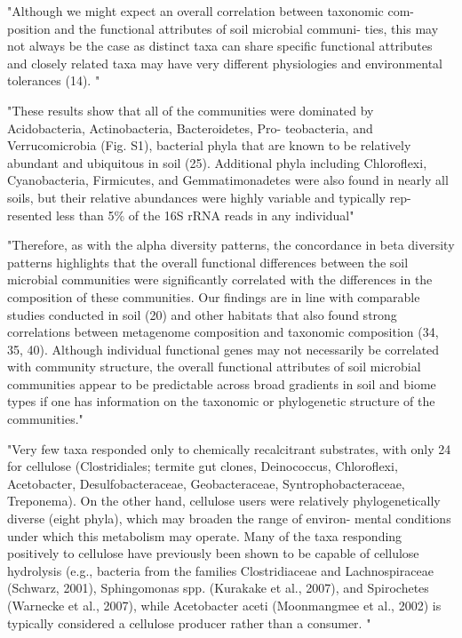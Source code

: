 "Although we might expect an overall correlation between taxonomic com- position and the functional attributes of soil microbial communi- ties, this may not always be the case as distinct taxa can share specific functional attributes and closely related taxa may have very different physiologies and environmental tolerances (14). "\cite{Fierer_2012}

"These results show that all of the communities were dominated by Acidobacteria, Actinobacteria, Bacteroidetes, Pro- teobacteria, and Verrucomicrobia (Fig. S1), bacterial phyla that are known to be relatively abundant and ubiquitous in soil (25). Additional phyla including Chloroflexi, Cyanobacteria, Firmicutes, and Gemmatimonadetes were also found in nearly all soils, but their relative abundances were highly variable and typically rep- resented less than 5\% of the 16S rRNA reads in any individual"\cite{Fierer_2012}

"Therefore, as with the alpha diversity patterns, the concordance in beta diversity patterns highlights that the overall functional differences between the soil microbial communities were significantly correlated with the differences in the composition of these communities. Our findings are in line with comparable studies conducted in soil (20) and other habitats that also found strong correlations between metagenome composition and taxonomic composition (34, 35, 40). Although individual functional genes may not necessarily be correlated with community structure, the overall functional attributes of soil microbial communities appear to be predictable across broad gradients in soil and biome types if one has information on the taxonomic or phylogenetic structure of the communities."\cite{Fierer_2012}

   "Very few taxa responded only to chemically recalcitrant substrates, with only 24 for cellulose (Clostridiales; termite gut clones, Deinococcus, Chloroflexi, Acetobacter, Desulfobacteraceae, Geobacteraceae, Syntrophobacteraceae, Treponema). On the other hand, cellulose users were relatively phylogenetically diverse (eight phyla), which may broaden the range of environ- mental conditions under which this metabolism may operate. Many of the taxa responding positively to cellulose have previously been shown to be capable of cellulose hydrolysis (e.g., bacteria from the families Clostridiaceae and Lachnospiraceae (Schwarz, 2001), Sphingomonas spp. (Kurakake et al., 2007), and Spirochetes (Warnecke et al., 2007), while Acetobacter aceti (Moonmangmee et al., 2002) is typically considered a cellulose producer rather than a consumer. "\cite{Goldfarb_2011}
   
